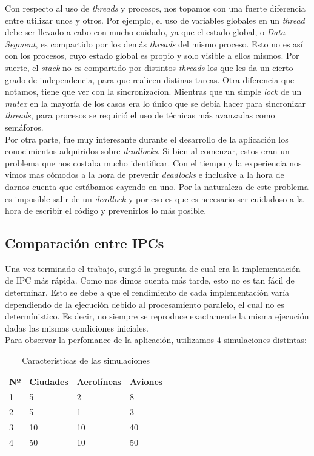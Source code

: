 \documentclass[a4paper,10pt]{article}
\begin{document}
Con respecto al uso de \textit{threads}  y procesos, nos topamos con una fuerte diferencia entre utilizar unos y otros. Por ejemplo, el uso de variables globales 
en un \textit{thread} debe ser llevado a cabo con mucho cuidado, ya que el estado global, o \textit{Data Segment}, es compartido por los demás \textit{threads} 
del mismo proceso. Esto no es así con los procesos, cuyo estado global es propio y solo visible a ellos mismos. Por suerte, el \textit{stack} no es compartido 
por distintos \textit{threads} los que les da un cierto grado de independencia, para que realicen distinas tareas. Otra diferencia que notamos, tiene que ver 
con la sincronizacíon. Mientras que un simple \textit{lock} de un \textit{mutex} en la mayoría de los casos era lo único que se debía hacer para sincronizar 
\textit{threads}, para procesos se requirió el uso de técnicas más avanzadas como semáforos.\\

Por otra parte, fue muy interesante durante el desarrollo de la aplicación los conocimientos adquiridos sobre \textit{deadlocks}.
Si bien al comenzar, estos eran un problema que nos costaba mucho identificar. Con el tiempo y la experiencia nos vimos mas cómodos
a la hora de prevenir \textit{deadlocks} e inclusive a la hora de darnos cuenta que estábamos cayendo en uno. Por la naturaleza de este
problema es imposible salir de un \textit{deadlock} y por eso es que es necesario ser cuidadoso a la hora de escribir el
código y prevenirlos lo más posible.\\


\subsection{Comparación entre IPCs}
Una vez terminado el trabajo, surgió la pregunta de cual era la implementación de IPC más rápida. Como nos dimos cuenta más tarde, esto no es tan fácil de determinar. 
Esto se debe a que el rendimiento de cada implementación varía dependiendo de la ejecución debido al procesamiento paralelo, el cual no es determínistico. 
Es decir, no siempre se reproduce exactamente la misma ejecución dadas las mismas condiciones iniciales. \\

Para observar la perfomance de la aplicación, utilizamos 4 simulaciones distintas:

\begin{table}[H]
\begin{center}
\begin{tabular}{l|l|l|l}
Nº & Ciudades & Aerolíneas & Aviones \\
\hline
1 & 5 & 2 & 8 \\
2 & 5 & 1 & 3 \\
3 & 10 & 10 & 40 \\
4 & 50 & 10 & 50 \\
\end{tabular}
\caption{Características de las simulaciones}
\end{center}
\end{table}
\end{document}
